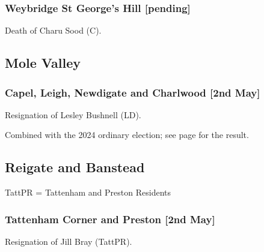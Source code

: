 \documentclass[a4paper,openany]{book}
\begin{document}
\begin{resultsiii}
\subsubsection*{Weybridge St George's Hill \hspace*{\fill}\nolinebreak[1]%
	\enspace\hspace*{\fill}
	[pending]}


Death of Charu Sood (C).

\subsection*{Mole Valley}

\subsubsection*{Capel, Leigh, Newdigate and Charlwood \hspace*{\fill}\nolinebreak[1]%
	\enspace\hspace*{\fill}
	[2nd May]}


Resignation of Lesley Bushnell (LD).

Combined with the 2024 ordinary election; see page \pageref{MoleValleyCapelLeighNewdigateCharlwood} for the result.

\subsection*{Reigate and Banstead}

TattPR = Tattenham and Preston Residents

\subsubsection*{Tattenham Corner and Preston \hspace*{\fill}\nolinebreak[1]%
	\enspace\hspace*{\fill}
	[2nd May]}


Resignation of Jill Bray (TattPR).


\end{resultsiii}
\end{document}
